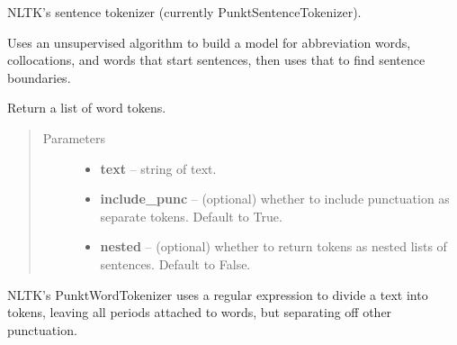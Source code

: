 \documentclass[letterpaper,10pt,english]{sphinxmanual}
\begin{document}
\begin{fulllineitems}
\begin{fulllineitems}
\label{api_reference:textblob_de.tokenizers.NLTKPunktTokenizer.sent_tokenize}
NLTK's sentence tokenizer (currently PunktSentenceTokenizer).

Uses an unsupervised algorithm to build a model for abbreviation
words, collocations, and words that start sentences, then uses
that to find sentence boundaries.

\end{fulllineitems}


\begin{fulllineitems}
\label{api_reference:textblob_de.tokenizers.NLTKPunktTokenizer.tokenize}
Return a list of word tokens.
\begin{quote}\begin{description}
\item[{Parameters}] \leavevmode\begin{itemize}
\item {} 
\textbf{text} -- string of text.

\item {} 
\textbf{include\_punc} -- (optional) whether to include punctuation as separate
tokens. Default to True.

\item {} 
\textbf{nested} -- (optional) whether to return tokens as nested lists of
sentences. Default to False.

\end{itemize}

\end{description}\end{quote}

\end{fulllineitems}


\begin{fulllineitems}
\label{api_reference:textblob_de.tokenizers.NLTKPunktTokenizer.word_tokenize}
NLTK's PunktWordTokenizer uses a regular expression to divide a text
into tokens, leaving all periods attached to words, but separating off
other punctuation.

\end{fulllineitems}


\end{fulllineitems}
\end{document}
